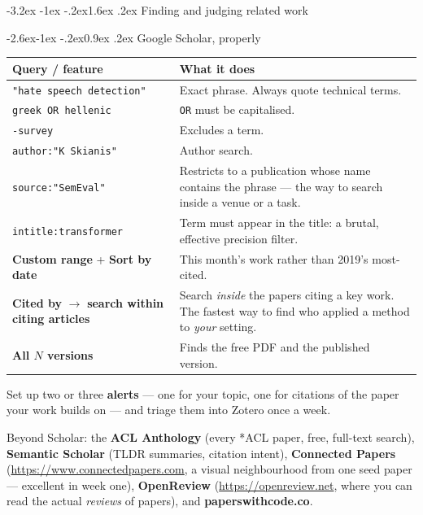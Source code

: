 \documentclass[11pt,a4paper]{article}
\makeatletter
\renewcommand\section{\@startsection{section}{1}{\z@}%
  {-3.2ex \@plus -1ex \@minus -.2ex}{1.6ex \@plus.2ex}%
  {\normalfont\Large\bfseries\color{brand}}}
\renewcommand\subsection{\@startsection{subsection}{2}{\z@}%
  {-2.6ex\@plus -1ex \@minus -.2ex}{0.9ex \@plus .2ex}%
  {\normalfont\large\bfseries\color{brandlight}}}
\newcommand{\thead}[1]{\textbf{\color{brand}#1}}
\newcommand{\code}[1]{\texttt{\small #1}}
\makeatother
\begin{document}
\section{Finding and judging related work}

\subsection{Google Scholar, properly}

\begin{center}
\small
\begin{tabularx}{\textwidth}{L{4.8cm} X}
\toprule
\thead{Query / feature} & \thead{What it does} \\
\midrule
{}
\code{"hate speech detection"} & Exact phrase. Always quote technical terms. \\
\code{greek OR hellenic} & \code{OR} must be capitalised. \\
\code{-survey} & Excludes a term. \\
\code{author:"K Skianis"} & Author search. \\
\code{source:"SemEval"} & Restricts to a publication whose name contains the
phrase --- the way to search inside a venue or a task. \\
\code{intitle:transformer} & Term must appear in the title: a brutal, effective
precision filter. \\
\textbf{Custom range} + \textbf{Sort by date} & This month's work rather than
2019's most-cited. \\
\textbf{Cited by} $\rightarrow$ \textbf{search within citing articles} &
Search \emph{inside} the papers citing a key work. The fastest way to find who
applied a method to \emph{your} setting. \\
\textbf{All $N$ versions} & Finds the free PDF and the published version. \\
\bottomrule
\end{tabularx}
\end{center}

Set up two or three \textbf{alerts} --- one for your topic, one for citations
of the paper your work builds on --- and triage them into Zotero once a week.

Beyond Scholar: the \textbf{ACL Anthology} (every *ACL paper, free, full-text
search), \textbf{Semantic Scholar} (TLDR summaries, citation intent),
\textbf{Connected Papers} (\url{https://www.connectedpapers.com}, a visual
neighbourhood from one seed paper --- excellent in week one),
\textbf{OpenReview} (\url{https://openreview.net}, where you can read the
actual \emph{reviews} of papers), and \textbf{paperswithcode.co}.
\end{document}
